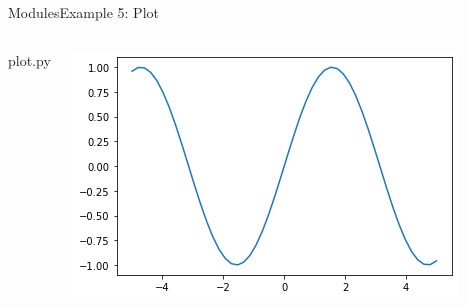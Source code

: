 \documentclass[10pt,compress]{beamer} %
\begin{document}
\begin{frame}{Modules}{Example 5: Plot}
	\begin{columns}

		\vspace{-0.2cm}
		\begin{exampleblock}{plot.py}
		\vspace{-0.2cm}
		
		\vspace{-0.2cm}
		\end{exampleblock}

		\vspace{-0.2cm}
		\centering \includegraphics[width=\linewidth]{figs/plot.png}\\
	\end{columns}
		\vspace{-0.2cm}
\end{frame}
\end{document}
